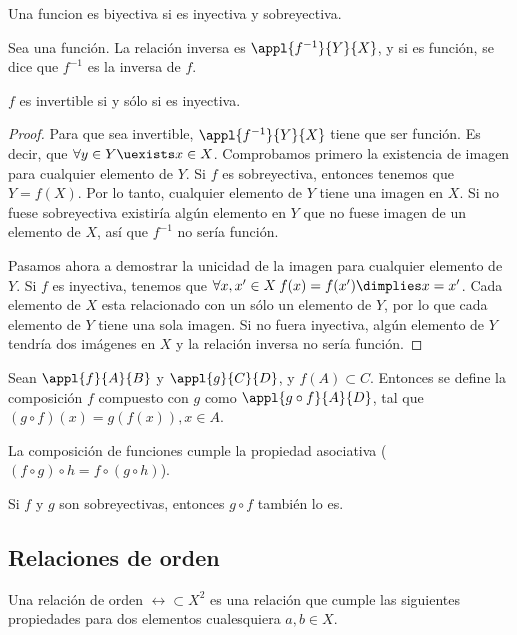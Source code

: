 \documentclass[nochap]{apuntes}
\begin{document}
\begin{defn}
Una funcion es biyectiva si es inyectiva y sobreyectiva.\end{defn}

\begin{defn} Sea \stdf una función. La relación inversa es $\appl{f^{-1}}{Y}{X}$, y si es función, se dice que $f^{-1}$ es la inversa de $f$.\end{defn}

\begin{prop} $f$ es invertible si y sólo si es inyectiva.

\begin{proof}
Para que \stdf sea invertible, $\appl{f^{-1}}{Y}{X}$ tiene que ser función. Es decir, que $\forall y\in Y \uexists x \in X$. Comprobamos primero la existencia de imagen para cualquier elemento de $Y$. Si $f$ es sobreyectiva, entonces tenemos que $Y=f(X)$. Por lo tanto, cualquier elemento de $Y$ tiene una imagen en $X$. Si no fuese sobreyectiva existiría algún elemento en $Y$ que no fuese imagen de un elemento de $X$, así que $f^{-1}$ no sería función.
 
Pasamos ahora a demostrar la unicidad de la imagen para cualquier elemento de $Y$. Si $f$ es inyectiva, tenemos que $\forall x,x' \in X \: f(x)=f(x') \dimplies x=x'$. Cada elemento de $X$ esta relacionado con un sólo un elemento de $Y$, por lo que cada elemento de $Y$ tiene una sola imagen. Si no fuera inyectiva, algún elemento de $Y$ tendría dos imágenes en $X$ y la relación inversa no sería función.
\end{proof}
\end{prop}

\begin{defn}[Composición] Sean $\appl{f}{A}{B}$ y $\appl{g}{C}{D}$, y $f(A)\subset C$. Entonces se define la composición $f$ compuesto con $g$ como $\appl{g\circ f}{A}{D}$, tal que $(g \circ f)(x)=g(f(x)), x \in A$.

La composición de funciones cumple la propiedad asociativa ($(f\circ g)\circ h=f\circ (g\circ h)$).

Si $f$ y $g$ son sobreyectivas, entonces $g\circ f$ también lo es.
\end{defn}

\subsection{Relaciones de orden}

Una relación de orden $\rel \subset X^2$ es una relación que cumple las siguientes propiedades para dos elementos cualesquiera $a,b \in X$.
\end{document}
